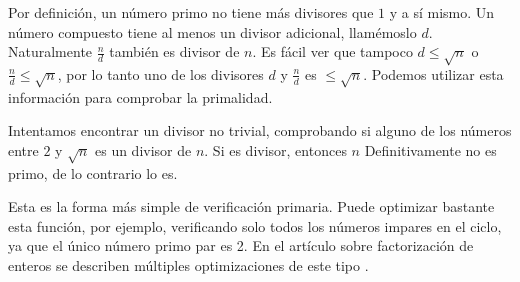 Por definición, un número primo no tiene más divisores que $1$ y a sí mismo. Un número compuesto tiene al menos un divisor adicional, llamémoslo $d$. Naturalmente $\frac{n}{d}$ también es divisor de $n$. Es fácil ver que tampoco $d\le\sqrt{n}$ o $\frac{n}{d} \le \sqrt{n}$, por lo tanto uno de los divisores $d$ y $\frac{n}{d}$ es $\le\sqrt{n}$. Podemos utilizar esta información para comprobar la primalidad.

Intentamos encontrar un divisor no trivial, comprobando si alguno de los números entre $2$ y $\sqrt{n}$ es un divisor de $n$. Si es divisor, entonces $n$ Definitivamente no es primo, de lo contrario lo es.

Esta es la forma más simple de verificación primaria. Puede optimizar bastante esta función, por ejemplo, verificando solo todos los números impares en el ciclo, ya que el único número primo par es 2. En el artículo sobre factorización de enteros se describen múltiples optimizaciones de este tipo .